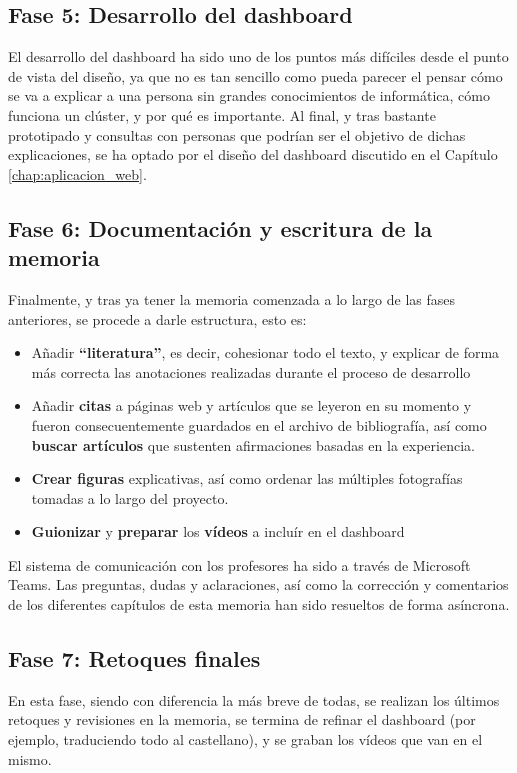 \subsection{Fase 5: Desarrollo del dashboard}
El desarrollo del dashboard ha sido uno de los puntos más difíciles desde el punto de vista del diseño, ya que no es tan sencillo como pueda parecer el pensar cómo se va a explicar a una persona sin grandes conocimientos de informática, cómo funciona un clúster, y por qué es importante. Al final, y tras bastante prototipado y consultas con personas que podrían ser el objetivo de dichas explicaciones, se ha optado por el diseño del dashboard discutido en el Capítulo \ref{chap:aplicacion_web}.

\subsection{Fase 6: Documentación y escritura de la memoria}
Finalmente, y tras ya tener la memoria comenzada a lo largo de las fases anteriores, se procede a darle estructura, esto es:
\begin{itemize}
    \item Añadir \textbf{``literatura''}, es decir, cohesionar todo el texto, y explicar de forma más correcta las anotaciones realizadas durante el proceso de desarrollo
    \item Añadir \textbf{citas} a páginas web y artículos que se leyeron en su momento y fueron consecuentemente guardados en el archivo de bibliografía, así como \textbf{buscar artículos} que sustenten afirmaciones basadas en la experiencia.
    \item \textbf{Crear figuras} explicativas, así como ordenar las múltiples fotografías tomadas a lo largo del proyecto.
    \item \textbf{Guionizar} y \textbf{preparar} los \textbf{vídeos} a incluír en el dashboard
\end{itemize}

El sistema de comunicación con los profesores ha sido a través de Microsoft Teams. Las preguntas, dudas y aclaraciones, así como la corrección y comentarios de los diferentes capítulos de esta memoria han sido resueltos de forma asíncrona.

\subsection{Fase 7: Retoques finales}
En esta fase, siendo con diferencia la más breve de todas, se realizan los últimos retoques y revisiones en la memoria, se termina de refinar el dashboard (por ejemplo, traduciendo todo al castellano), y se graban los vídeos que van en el mismo.


